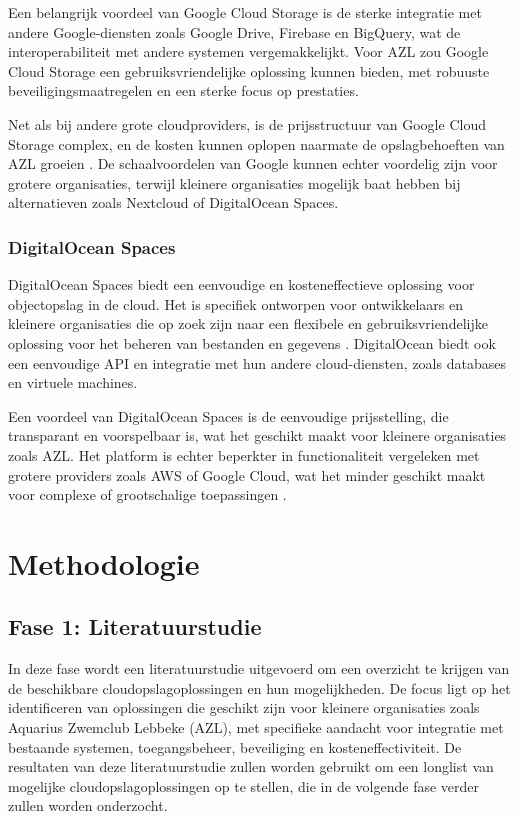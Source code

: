 Een belangrijk voordeel van Google Cloud Storage is de sterke integratie met andere Google-diensten zoals Google Drive, Firebase en BigQuery, wat de interoperabiliteit met andere systemen vergemakkelijkt. Voor AZL zou Google Cloud Storage een gebruiksvriendelijke oplossing kunnen bieden, met robuuste beveiligingsmaatregelen en een sterke focus op prestaties.

Net als bij andere grote cloudproviders, is de prijsstructuur van Google Cloud Storage complex, en de kosten kunnen oplopen naarmate de opslagbehoeften van AZL groeien \autocite{google_pricing}. De schaalvoordelen van Google kunnen echter voordelig zijn voor grotere organisaties, terwijl kleinere organisaties mogelijk baat hebben bij alternatieven zoals Nextcloud of DigitalOcean Spaces.

\subsubsection{DigitalOcean Spaces}
DigitalOcean Spaces biedt een eenvoudige en kosteneffectieve oplossing voor objectopslag in de cloud. Het is specifiek ontworpen voor ontwikkelaars en kleinere organisaties die op zoek zijn naar een flexibele en gebruiksvriendelijke oplossing voor het beheren van bestanden en gegevens \autocite{digitalocean_spaces}. DigitalOcean biedt ook een eenvoudige API en integratie met hun andere cloud-diensten, zoals databases en virtuele machines.

Een voordeel van DigitalOcean Spaces is de eenvoudige prijsstelling, die transparant en voorspelbaar is, wat het geschikt maakt voor kleinere organisaties zoals AZL. Het platform is echter beperkter in functionaliteit vergeleken met grotere providers zoals AWS of Google Cloud, wat het minder geschikt maakt voor complexe of grootschalige toepassingen \autocite{digitalocean_pricing}.





\section{Methodologie}%
\label{sec:methodologie}
\subsection{Fase 1: Literatuurstudie}
In deze fase wordt een literatuurstudie uitgevoerd om een overzicht te krijgen van de beschikbare cloudopslagoplossingen en hun mogelijkheden. De focus ligt op het identificeren van oplossingen die geschikt zijn voor kleinere organisaties zoals Aquarius Zwemclub Lebbeke (AZL), met specifieke aandacht voor integratie met bestaande systemen, toegangsbeheer, beveiliging en kosteneffectiviteit. De resultaten van deze literatuurstudie zullen worden gebruikt om een longlist van mogelijke cloudopslagoplossingen op te stellen, die in de volgende fase verder zullen worden onderzocht.

